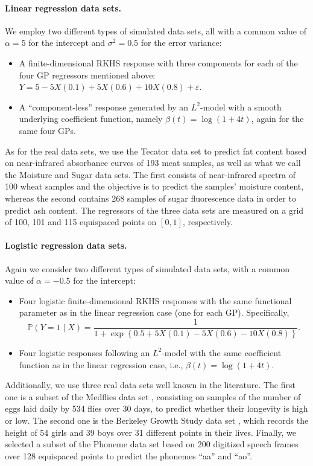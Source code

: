 \documentclass{article}
\numberwithin{equation}{section}
\theoremstyle{plain}
\theoremstyle{definition}
\renewcommand{\epsilon}{\varepsilon}
\begin{document}
\paragraph*{Linear regression data sets.} We employ two different types of simulated data sets, all with a common value of \(\alpha=5\) for the intercept and \(\sigma^2=0.5\) for the error variance:
\begin{itemize}
  \item A finite-dimensional RKHS response with three components for each of the four GP regressors mentioned above: \(Y=5 -5X(0.1) + 5X(0.6) + 10X(0.8) + \epsilon\).
  \item A ``component-less'' response generated by an \(L^2\)-model with a smooth underlying coefficient function, namely \(\beta(t)=\log(1+4t)\), again for the same four GPs.
\end{itemize}
As for the real data sets, we use the Tecator data set \citep{borggaard1992optimal} to predict fat content based on near-infrared absorbance curves of 193 meat samples, as well as what we call the Moisture \citep{kalivas1997two} and Sugar \citep{bro1999exploratory} data sets. The first consists of near-infrared spectra of 100 wheat samples and the objective is to predict the samples' moisture content, whereas the second contains 268 samples of sugar fluorescence data in order to predict ash content. The regressors of the three data sets are measured on a grid of 100, 101 and 115 equispaced points on \([0, 1]\), respectively.

\paragraph*{Logistic regression data sets.} Again we consider two different types of simulated data sets, with a common value of \(\alpha=-0.5\) for the intercept:
\begin{itemize}
  \item Four logistic finite-dimensional RKHS responses with the same functional parameter as in the linear regression case (one for each GP). Specifically,
        \[
          \mathbb P(Y=1\mid X) = \frac{1}{1 + \exp\left\{0.5 +5X(0.1) - 5X(0.6) - 10X(0.8)\right\}}.
        \]
  \item Four logistic responses following an \(L^2\)-model with the same coefficient function as in the linear regression case, i.e., \(\beta(t)=\log(1+4t)\).
\end{itemize}
Additionally, we use three real data sets well known in the literature. The first one is a subset of the Medflies data set \citep{carey1998relationship}, consisting on samples of the number of eggs laid daily by 534 flies over 30 days, to predict whether their longevity is high or low. The second one is the Berkeley Growth Study data set \citep{tuddenham1954physical}, which records the height of 54 girls and 39 boys over 31 different points in their lives. Finally, we selected a subset of the Phoneme data set \citep{hastie1995penalized} based on 200 digitized speech frames over 128 equispaced points to predict the phonemes ``aa'' and ``ao''.
\end{document}
